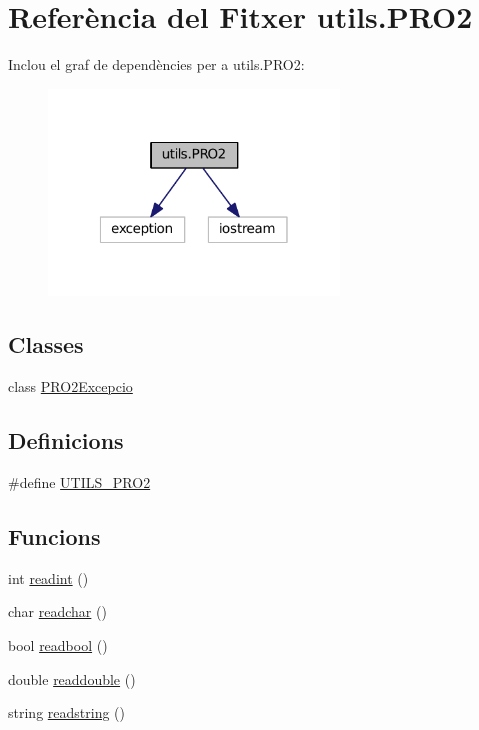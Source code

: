 \hypertarget{utils_8_p_r_o2}{\section{Referència del Fitxer utils.\-P\-R\-O2}
\label{utils_8_p_r_o2}
}
Inclou el graf de dependències per a utils.\-P\-R\-O2\-:\nopagebreak
\begin{figure}[H]
\begin{center}
\leavevmode
\includegraphics[width=219pt]{utils_8_p_r_o2__incl}
\end{center}
\end{figure}
\subsection*{Classes}
\begin{DoxyCompactItemize}
\item 
class \hyperlink{class_p_r_o2_excepcio}{P\-R\-O2\-Excepcio}
\end{DoxyCompactItemize}
\subsection*{Definicions}
\begin{DoxyCompactItemize}
\item 
\#define \hyperlink{utils_8_p_r_o2_a8610c03aa2297bae1b7872a63c84b353}{U\-T\-I\-L\-S\-\_\-\-P\-R\-O2}
\end{DoxyCompactItemize}
\subsection*{Funcions}
\begin{DoxyCompactItemize}
\item 
int \hyperlink{utils_8_p_r_o2_a49000a716e38017061f71cbefe697a9c}{readint} ()
\item 
char \hyperlink{utils_8_p_r_o2_a831a2329c820ba9b9b378131ed143ff5}{readchar} ()
\item 
bool \hyperlink{utils_8_p_r_o2_a56691e176645da552c107ef124ad701a}{readbool} ()
\item 
double \hyperlink{utils_8_p_r_o2_a2379d4429b4e913e714a3c889061c61c}{readdouble} ()
\item 
string \hyperlink{utils_8_p_r_o2_a0785c313e983db73f256ae0ccf34591c}{readstring} ()
\end{DoxyCompactItemize}


